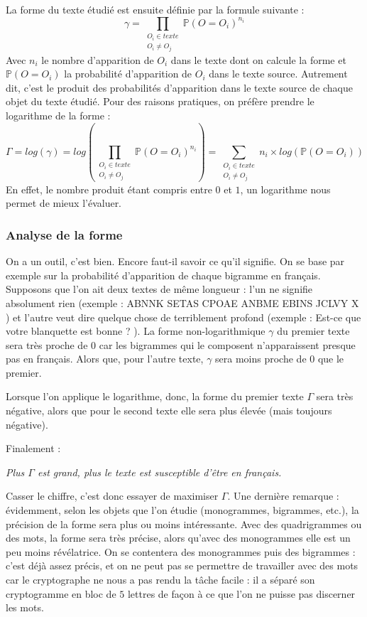 \documentclass[a4paper, titlepage]{livret}
\begin{document}
La forme du texte étudié est ensuite définie par la formule suivante :
\[ \gamma = \prod \limits_{\substack{{O_{i} \in texte} \\ O_{i} \neq O_{j}}} \mathbb{P}(O = O_{i})^{n_{i}} \]
Avec $n_{i}$ le nombre d'apparition de $O_{i}$ dans le texte dont on calcule la forme et $\mathbb{P}(O = O_{i})$ la probabilité d'apparition de $O_{i}$ dans le texte source.
Autrement dit, c'est le produit des probabilités d'apparition dans le texte source de chaque objet du texte étudié.
Pour des raisons pratiques, on préfère prendre le logarithme de la forme :
\[ \Gamma = log(\gamma) = log(\prod \limits_{\substack{{O_{i} \in texte} \\ O_{i} \neq O_{j}}}  \mathbb{P}(O = O_{i})^{n_{i}}) = \sum \limits_{\substack{{O_{i} \in texte} \\ O_{i} \neq O_{j}}}  n_{i} \times log(\mathbb{P}(O = O_{i}))\]
En effet, le nombre produit étant compris entre $0$ et $1$, un logarithme nous permet de mieux l'évaluer.

\subsubsection{Analyse de la forme}

On a un outil, c'est bien. Encore faut-il savoir ce qu'il signifie.
On se base par exemple sur la probabilité d'apparition de chaque bigramme en français.
Supposons que l'on ait deux textes de même longueur : l'un ne signifie absolument rien (exemple : \og ABNNK SETAS CPOAE ANBME EBINS JCLVY X \fg{}) et l'autre veut dire quelque chose de terriblement profond (exemple : \og Est-ce que votre blanquette est bonne ? \fg{}).
La forme non-logarithmique $\gamma$ du premier texte sera très proche de $0$ car les bigrammes qui le composent n'apparaissent presque pas en français.
Alors que, pour l'autre texte, $\gamma$ sera moins proche de $0$ que le premier.

Lorsque l'on applique le logarithme, donc, la forme du premier texte $\Gamma$ sera très négative, alors que pour le second texte elle sera plus élevée (mais toujours négative).

Finalement :
\begin{center}
 \emph{Plus $\Gamma$ est grand, plus le texte est susceptible d'être en français.}
\end{center}

Casser le chiffre, c'est donc essayer de maximiser $\Gamma$.
Une dernière remarque : évidemment, selon les objets que l'on étudie (monogrammes, bigrammes, etc.), la précision de la forme sera plus ou moins intéressante.
Avec des quadrigrammes ou des mots, la forme sera très précise, alors qu'avec des monogrammes elle est un peu moins révélatrice.
On se contentera des monogrammes puis des bigrammes : c'est déjà assez précis, et on ne peut pas se permettre de travailler avec des mots car le cryptographe ne nous a pas rendu la tâche facile : il a séparé son cryptogramme en bloc de $5$ lettres de façon à ce que l'on ne puisse pas discerner les mots.
\end{document}
